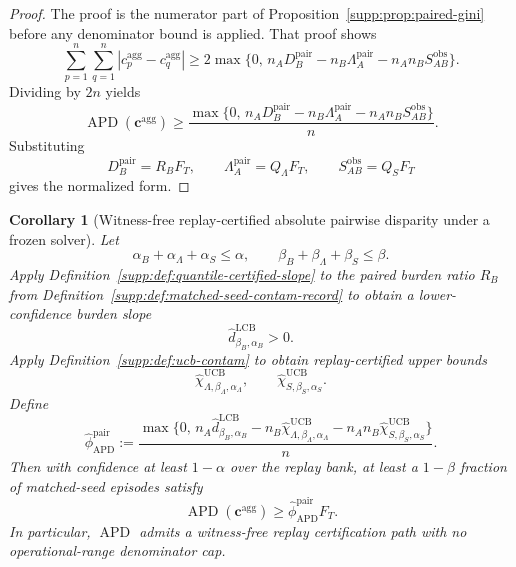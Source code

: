 \documentclass[11pt]{article}
\newcommand{\1}{\mathbf{1}}
\newcommand{\APD}{\operatorname{APD}}
\theoremstyle{definition}
\theoremstyle{plain}
\newtheorem{corollary}[definition]{Corollary}
\theoremstyle{remark}
\begin{document}
\begin{proof}
The proof is the numerator part of Proposition~\ref{supp:prop:paired-gini} before any denominator bound is applied. That proof shows
\[
\sum_{p=1}^n\sum_{q=1}^n |c_p^{\mathrm{agg}} - c_q^{\mathrm{agg}}|
\ge
2\max\{0,\,
 n_A D_B^{\mathrm{pair}}
 - n_B \Lambda_A^{\mathrm{pair}}
 - n_A n_B S_{AB}^{\mathrm{obs}}
\}.
\]
Dividing by $2n$ yields
\[
\APD(\mathbf c^{\mathrm{agg}})
\ge
\frac{\max\{0,\,
 n_A D_B^{\mathrm{pair}}
 - n_B \Lambda_A^{\mathrm{pair}}
 - n_A n_B S_{AB}^{\mathrm{obs}}
\}}{n}.
\]
Substituting
\[
D_B^{\mathrm{pair}} = R_B F_T,
\qquad
\Lambda_A^{\mathrm{pair}} = Q_\Lambda F_T,
\qquad
S_{AB}^{\mathrm{obs}} = Q_S F_T
\]
gives the normalized form.
\end{proof}

\begin{corollary}[Witness-free replay-certified absolute pairwise disparity under a frozen solver]
\label{supp:cor:witness-free-apd}
Let
\[
\alpha_B+\alpha_\Lambda+\alpha_S \le \alpha,
\qquad
\beta_B+\beta_\Lambda+\beta_S \le \beta.
\]
Apply Definition~\ref{supp:def:quantile-certified-slope} to the paired burden ratio $R_B$ from Definition~\ref{supp:def:matched-seed-contam-record} to obtain a lower-confidence burden slope
\[
\widehat d^{\mathrm{LCB}}_{\beta_B,\alpha_B}>0.
\]
Apply Definition~\ref{supp:def:ucb-contam} to obtain replay-certified upper bounds
\[
\widehat\chi_{\Lambda,\beta_\Lambda,\alpha_\Lambda}^{\mathrm{UCB}},
\qquad
\widehat\chi_{S,\beta_S,\alpha_S}^{\mathrm{UCB}}.
\]
Define
\[
\widehat\phi_{\APD}^{\mathrm{pair}}
:=
\frac{
\max\{0,\,
 n_A \widehat d^{\mathrm{LCB}}_{\beta_B,\alpha_B}
 - n_B \widehat\chi_{\Lambda,\beta_\Lambda,\alpha_\Lambda}^{\mathrm{UCB}}
 - n_A n_B \widehat\chi_{S,\beta_S,\alpha_S}^{\mathrm{UCB}}
\}
}{n}.
\]
Then with confidence at least $1-\alpha$ over the replay bank, at least a $1-\beta$ fraction of matched-seed episodes satisfy
\[
\APD(\mathbf c^{\mathrm{agg}})
\ge
\widehat\phi_{\APD}^{\mathrm{pair}} F_T.
\]
In particular, $\APD$ admits a witness-free replay certification path with no operational-range denominator cap.
\end{corollary}
\end{document}
